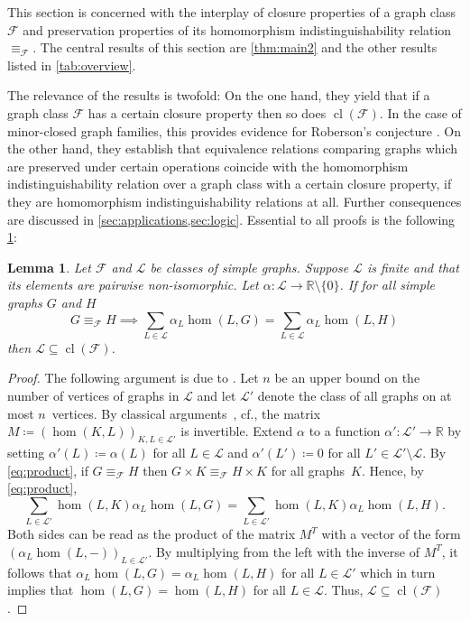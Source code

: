 \documentclass[3p,final]{elsarticle}
\DeclareMathOperator{\cl}{cl}
\newtheorem{lemma}[theorem]{Lemma}
\begin{document}
	
	This section is concerned with the interplay of closure properties of a graph class $\mathcal{F}$ and preservation properties of its homomorphism indistinguishability relation $\equiv_{\mathcal{F}}$. The central results of this section are \cref{thm:main2} and the other results listed in \cref{tab:overview}.  
	
	The relevance of the results is twofold: On the one hand, they yield that if a graph class $\mathcal{F}$ has a certain closure property then so does $\cl(\mathcal{F})$. In the case of minor-closed graph families, this provides evidence for Roberson's conjecture \cite{roberson_oddomorphisms_2022}. On the other hand, they establish that equivalence relations comparing graphs which are preserved under certain operations coincide with the homomorphism indistinguishability relation over a graph class with a certain closure property, if they are homomorphism indistinguishability relations at all. 
	Further consequences are discussed in \cref{sec:applications,sec:logic}.
	Essential to all proofs is the following \cref{lem:lincomb}:
	
	\begin{lemma} \label{lem:lincomb}
		Let $\mathcal{F}$ and $\mathcal{L}$ be classes of simple graphs.
		Suppose $\mathcal{L}$ is finite 
		and that its elements are pairwise non-isomorphic.
		Let $\alpha \colon \mathcal{L} \to \mathbb{R} \setminus \{0\}$. If for all simple graphs $G$ and $H$
		\[
		G \equiv_{\mathcal{F}} H \implies \sum_{L \in \mathcal{L}} \alpha_L \hom(L, G) = \sum_{L \in \mathcal{L}} \alpha_L \hom(L, H)
		\]
		then $\mathcal{L} \subseteq \cl(\mathcal{F})$.
	\end{lemma}

	\begin{proof}
		The following argument is due to \cite[Lemma~3.6]{curticapean_homomorphisms_2017}. 
		Let $n$ be an upper bound on the number of vertices of graphs in $\mathcal{L}$ and let $\mathcal{L}'$ denote the class of all graphs on at most $n$~vertices. 
		By classical arguments~\cite{lovasz_operations_1967}, cf.\@ \cite[Proposition~5.44(b)]{lovasz_large_2012}, the matrix $M \coloneqq (\hom(K, L))_{K, L \in \mathcal{L}'}$ is invertible. Extend $\alpha$ to a function $\alpha' \colon \mathcal{L}' \to \mathbb{R}$ by setting $\alpha'(L) \coloneqq \alpha(L)$ for all $L \in \mathcal{L}$ and $\alpha'(L') \coloneqq 0$ for all $L' \in \mathcal{L}' \setminus \mathcal{L}$.
		By \cref{eq:product}, if $G \equiv_{\mathcal{F}} H$ then $G \times K \equiv_{\mathcal{F}} H \times K$ for all graphs~$K$. Hence, by \cref{eq:product},
		\[
		\sum_{L \in \mathcal{L'}} \hom(L, K) \alpha_L \hom(L, G) = \sum_{L \in \mathcal{L'}} \hom(L, K) \alpha_L \hom(L, H).
		\]
		Both sides can be read as the product of the matrix $M^T$ with a vector of the form $(\alpha_L \hom(L, -))_{L \in \mathcal{L'}}$. 
		By multiplying from the left with the inverse of $M^T$,
		it follows that $\alpha_L \hom(L, G) = \alpha_L \hom(L, H)$ for all $L \in \mathcal{L}'$ which in turn implies that $\hom(L, G) = \hom(L, H)$ for all $L \in \mathcal{L}$. Thus, $\mathcal{L} \subseteq \cl(\mathcal{F})$.
	\end{proof}
\end{document}
